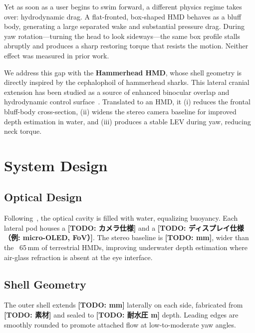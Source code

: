 \documentclass[sigconf]{acmart}
\begin{document}
Yet as soon as a user begins to swim forward, a different physics regime
takes over: hydrodynamic drag.
A flat-fronted, box-shaped HMD behaves as a bluff body, generating
a large separated wake and substantial pressure drag.
During yaw rotation—turning the head to look sideways—the same box profile
stalls abruptly and produces a sharp restoring torque that resists the motion.
Neither effect was measured in prior work.

We address this gap with the \textbf{Hammerhead HMD}, whose shell geometry
is directly inspired by the cephalophoil of hammerhead sharks.
This lateral cranial extension has been studied as a source of enhanced
binocular overlap and hydrodynamic control surface~\cite{kajiura2003}.
Translated to an HMD, it (i) reduces the frontal bluff-body cross-section,
(ii) widens the stereo camera baseline for improved depth estimation in water,
and (iii) produces a stable LEV during yaw, reducing neck torque.

\section{System Design}


\subsection{Optical Design}
Following~\cite{zhang2016safe,osone2017optimized}, the optical cavity is filled with water,
equalizing buoyancy.
Each lateral pod houses a \textbf{[TODO: カメラ仕様]} and a
\textbf{[TODO: ディスプレイ仕様（例: micro-OLED, FoV）]}.
The stereo baseline is \textbf{[TODO: mm]},
wider than the ~65\,mm of terrestrial HMDs,
improving underwater depth estimation where air-glass refraction
is absent at the eye interface.

\subsection{Shell Geometry}
The outer shell extends \textbf{[TODO: mm]} laterally on each side,
fabricated from \textbf{[TODO: 素材]} and sealed to
\textbf{[TODO: 耐水圧 m]} depth.
Leading edges are smoothly rounded to promote attached flow
at low-to-moderate yaw angles.

\end{document}
